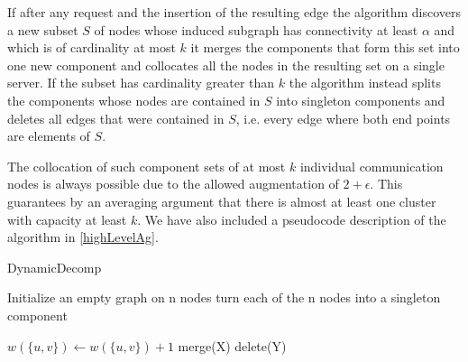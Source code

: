 \documentclass[xcolor=dvipsnames, tikz, 11pt]{article}
\newcommand{\nl}{\newline}
\theoremstyle{definition}
\begin{document}
	If after any request and the insertion of the resulting edge the algorithm discovers a new subset $S$ of nodes whose induced subgraph has connectivity at least $\alpha$ and which is of cardinality at most $k$ it merges the components that form this set into one new component and collocates all the nodes in the resulting set on a single server. If the subset has cardinality greater than $k$ the algorithm instead splits the components whose nodes are contained in $S$ into singleton components and deletes all edges that were contained in $S$, i.e. every edge where both end points are elements of $S$.
	
	The collocation of such component sets of at most $k$ individual communication nodes is always possible due to the allowed augmentation of $2+\epsilon$. This guarantees by an averaging argument that there is almost at least one cluster with capacity at least $k$. We have also included a pseudocode description of the algorithm in \cref{highLevelAg}.\nl\nl
	
	\begin{algorithm}
		\caption{DynamicDecomp}
		\label{highLevelAg}
		\begin{algorithmic}
			\STATE Initialize an empty graph on n nodes
			\STATE turn each of the n nodes into a singleton component
			
			\STATE $w(\{u,v\})\gets w(\{u,v\})+1$
			\ENDIF
			\STATE merge(X)
			\ENDIF
			\STATE delete(Y)
			\ENDIF	
			
			\ENDFOR
					
		\end{algorithmic}
	\end{algorithm}
	
\end{document}
